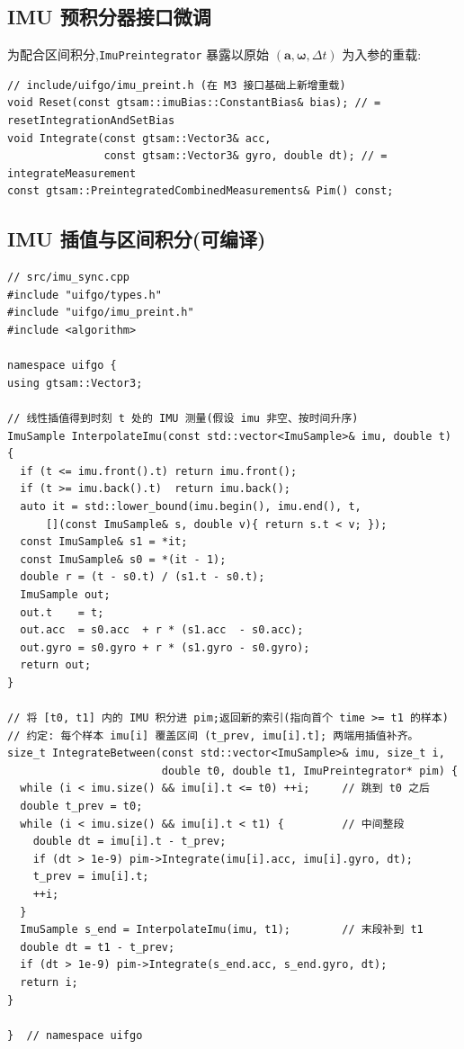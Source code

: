 \documentclass[11pt,a4paper]{report}
\newcommand{\ba}{\bm{a}}
\newcommand{\bw}{\bm{\omega}}
\begin{document}
\subsection{IMU 预积分器接口微调}
为配合区间积分,\texttt{ImuPreintegrator} 暴露以原始 $(\ba,\bw,\Delta t)$ 为入参的重载:
\begin{lstlisting}[style=cpp]
// include/uifgo/imu_preint.h (在 M3 接口基础上新增重载)
void Reset(const gtsam::imuBias::ConstantBias& bias); // = resetIntegrationAndSetBias
void Integrate(const gtsam::Vector3& acc,
               const gtsam::Vector3& gyro, double dt); // = integrateMeasurement
const gtsam::PreintegratedCombinedMeasurements& Pim() const;
\end{lstlisting}

\subsection{IMU 插值与区间积分(可编译)}
\begin{lstlisting}[style=cpp]
// src/imu_sync.cpp
#include "uifgo/types.h"
#include "uifgo/imu_preint.h"
#include <algorithm>

namespace uifgo {
using gtsam::Vector3;

// 线性插值得到时刻 t 处的 IMU 测量(假设 imu 非空、按时间升序)
ImuSample InterpolateImu(const std::vector<ImuSample>& imu, double t) {
  if (t <= imu.front().t) return imu.front();
  if (t >= imu.back().t)  return imu.back();
  auto it = std::lower_bound(imu.begin(), imu.end(), t,
      [](const ImuSample& s, double v){ return s.t < v; });
  const ImuSample& s1 = *it;
  const ImuSample& s0 = *(it - 1);
  double r = (t - s0.t) / (s1.t - s0.t);
  ImuSample out;
  out.t    = t;
  out.acc  = s0.acc  + r * (s1.acc  - s0.acc);
  out.gyro = s0.gyro + r * (s1.gyro - s0.gyro);
  return out;
}

// 将 [t0, t1] 内的 IMU 积分进 pim;返回新的索引(指向首个 time >= t1 的样本)
// 约定: 每个样本 imu[i] 覆盖区间 (t_prev, imu[i].t]; 两端用插值补齐。
size_t IntegrateBetween(const std::vector<ImuSample>& imu, size_t i,
                        double t0, double t1, ImuPreintegrator* pim) {
  while (i < imu.size() && imu[i].t <= t0) ++i;     // 跳到 t0 之后
  double t_prev = t0;
  while (i < imu.size() && imu[i].t < t1) {         // 中间整段
    double dt = imu[i].t - t_prev;
    if (dt > 1e-9) pim->Integrate(imu[i].acc, imu[i].gyro, dt);
    t_prev = imu[i].t;
    ++i;
  }
  ImuSample s_end = InterpolateImu(imu, t1);        // 末段补到 t1
  double dt = t1 - t_prev;
  if (dt > 1e-9) pim->Integrate(s_end.acc, s_end.gyro, dt);
  return i;
}

}  // namespace uifgo
\end{lstlisting}
\end{document}
